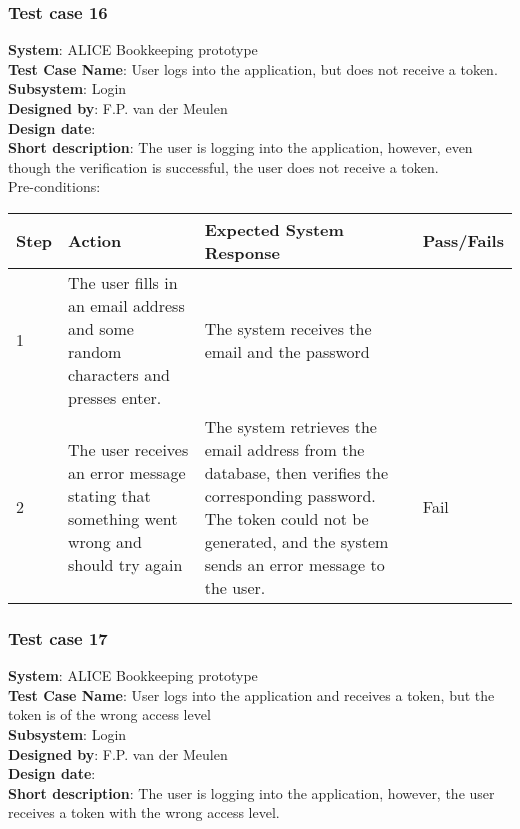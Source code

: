 \subsubsection{Test case 16}
\textbf{System}:  ALICE Bookkeeping prototype \\
\textbf{Test Case Name}:  User logs into the application, but does not receive a token. \\
\textbf{Subsystem}:  Login \\
\textbf{Designed by}:  F.P. van der Meulen\\
\textbf{Design date}:  \\
\textbf{Short description}: The user is logging into the application, however, even though the verification is successful, the user does not receive a token. \\

Pre-conditions: \\

\begin{longtable}{ | p{0.8cm} | p{4.5cm} | p{6cm} | p{1.5cm} |}
\hline
Step & Action & Expected System Response & Pass/Fails  \\ \hline
1 & The user fills in an email address and some random characters and presses enter. & The system receives the email and the password &  \\ \hline
2 & The user receives an error message stating that something went wrong and should try again & The system retrieves the email address from the database, then verifies the corresponding password.  The token could not be generated, and the system sends an error message to the user. & Fail \\ \hline
\end{longtable}

\subsubsection{Test case 17}
\textbf{System}:  ALICE Bookkeeping prototype \\
\textbf{Test Case Name}:  User logs into the application and receives a token, but the token is of the wrong access level \\
\textbf{Subsystem}:  Login \\
\textbf{Designed by}:  F.P. van der Meulen\\
\textbf{Design date}:  \\
\textbf{Short description}: The user is logging into the application, however, the user receives a token with the wrong access level. \\

